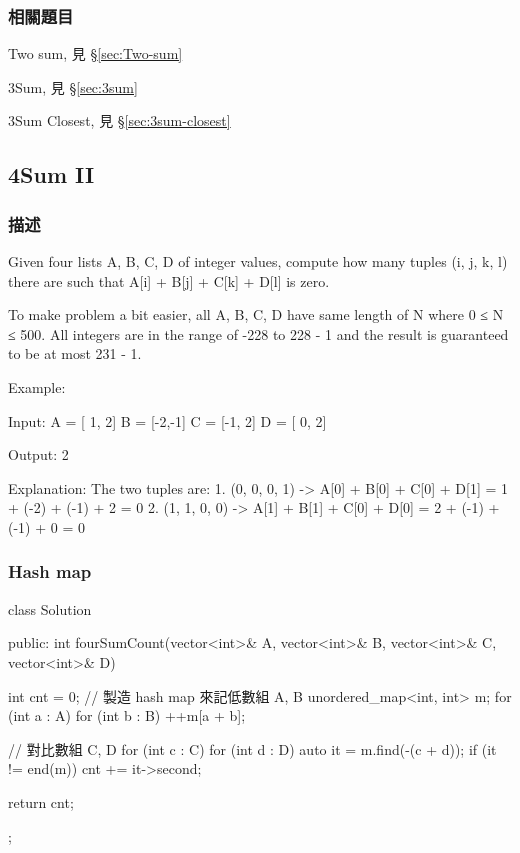 \subsubsection{相關題目}
\begindot
\item Two sum, 見 \S \ref{sec:Two-sum}
\item 3Sum, 見 \S \ref{sec:3sum}
\item 3Sum Closest, 見 \S \ref{sec:3sum-closest}
\myenddot

\subsection{4Sum II} %
\label{sec:4sum-ii}


\subsubsection{描述}
Given four lists A, B, C, D of integer values, compute how many tuples (i, j, k, l) there are such that A[i] + B[j] + C[k] + D[l] is zero.

To make problem a bit easier, all A, B, C, D have same length of N where 0 ≤ N ≤ 500. All integers are in the range of -228 to 228 - 1 and the result is guaranteed to be at most 231 - 1.

Example:
\begin{Code}
Input:
A = [ 1, 2]
B = [-2,-1]
C = [-1, 2]
D = [ 0, 2]

Output:
2

Explanation:
The two tuples are:
1. (0, 0, 0, 1) -> A[0] + B[0] + C[0] + D[1] = 1 + (-2) + (-1) + 2 = 0
2. (1, 1, 0, 0) -> A[1] + B[1] + C[0] + D[0] = 2 + (-1) + (-1) + 0 = 0
\end{Code}


\subsubsection{Hash map}
\begin{Code}
class Solution {
public:
    int fourSumCount(vector<int>& A, vector<int>& B, vector<int>& C, vector<int>& D) {
        int cnt = 0;
        // 製造 hash map 來記低數組 A, B
        unordered_map<int, int> m;
        for (int a : A)
            for (int b : B)
                ++m[a + b];

        // 對比數組 C, D
        for (int c : C)
            for (int d : D) {
                auto it = m.find(-(c + d));
                if (it != end(m))
                    cnt += it->second;
            }

        return cnt;
    }
};
\end{Code}

